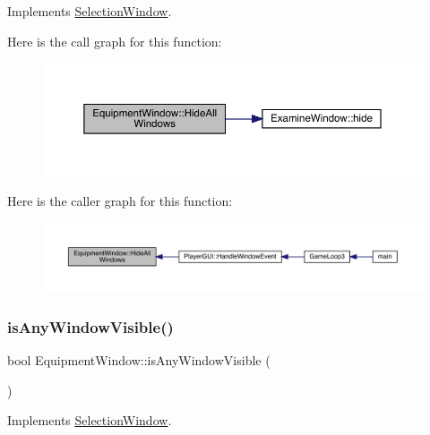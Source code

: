 Implements \mbox{\hyperlink{class_selection_window_a1d0561e5fbd751025c71484589f83841}{Selection\+Window}}.

Here is the call graph for this function\+:
\nopagebreak
\begin{figure}[H]
\begin{center}
\leavevmode
\includegraphics[width=350pt]{d8/dcb/class_equipment_window_a9ff317935c0c7698a4cde661348ad059_cgraph}
\end{center}
\end{figure}
Here is the caller graph for this function\+:
\nopagebreak
\begin{figure}[H]
\begin{center}
\leavevmode
\includegraphics[width=350pt]{d8/dcb/class_equipment_window_a9ff317935c0c7698a4cde661348ad059_icgraph}
\end{center}
\end{figure}
\mbox{\label{class_equipment_window_a8d311134213a637a7de2d9a3885c716c}} 
\subsubsection{\texorpdfstring{is\+Any\+Window\+Visible()}{isAnyWindowVisible()}}
{\footnotesize\ttfamily bool Equipment\+Window\+::is\+Any\+Window\+Visible (\begin{DoxyParamCaption}{ }\end{DoxyParamCaption})\hspace{0.3cm}{\ttfamily [virtual]}}



Implements \mbox{\hyperlink{class_selection_window_ad68953313a12ca42cafea68e15077c86}{Selection\+Window}}.


